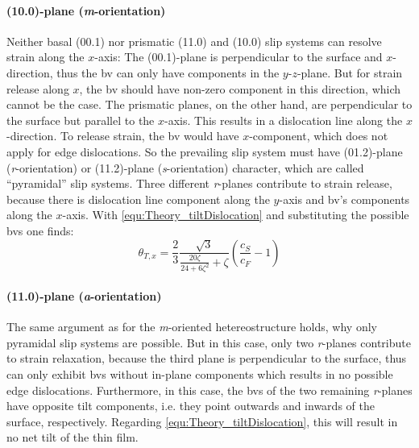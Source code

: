 \paragraph{(10.0)-plane (\textit{m}-orientation)}
Neither basal (00.1) nor prismatic (11.0) and (10.0) slip systems can resolve strain along the $x$-axis:
The (00.1)-plane is perpendicular to the surface and $x$-direction, thus the \gls{bv} can only have components in the $y$-$z$-plane.
But for strain release along $x$, the \gls{bv} should have non-zero component in this direction, which cannot be the case.
The prismatic planes, on the other hand, are perpendicular to the surface but parallel to the $x$-axis.
This results in a dislocation line along the $x$-direction.
To release strain, the \gls{bv} would have $x$-component, which does not apply for edge dislocations.
So the prevailing slip system must have (01.2)-plane (\textit{r}-orientation) or (11.2)-plane (\textit{s}-orientation) character, which are called \enquote{pyramidal} slip systems.
Three different \textit{r}-planes contribute to strain release, because there is dislocation line component along the $y$-axis and \gls{bv}'s components along the $x$-axis.
With \eqref{equ:Theory_tiltDislocation} and substituting the possible \glspl{bv} one finds:
\begin{equation}
    \theta_{T,x}=\frac{2}{3}\frac{\sqrt{3}}{\frac{20\zeta}{24+6\zeta^2}+\zeta}\left(\frac{c_S}{c_F}-1\right)
\end{equation}

\paragraph{(11.0)-plane (\textit{a}-orientation)}
The same argument as for the \textit{m}-oriented hetereostructure holds, why only pyramidal slip systems are possible.
But in this case, only two \textit{r}-planes contribute to strain relaxation, because the third plane is perpendicular to the surface, thus can only exhibit \glspl{bv} without in-plane components which results in no possible edge dislocations.
Furthermore, in this case, the \glspl{bv} of the two remaining \textit{r}-planes have opposite tilt components, i.e. they point outwards and inwards of the surface, respectively.
Regarding \eqref{equ:Theory_tiltDislocation}, this will result in no net tilt of the thin film.

